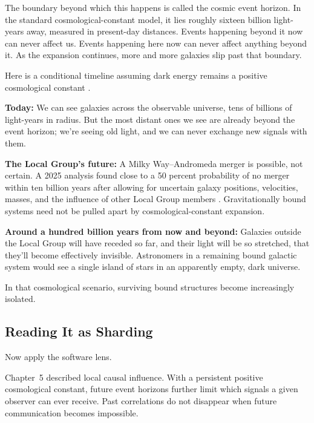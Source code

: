 The boundary beyond which this happens is called the cosmic event horizon. In the standard cosmological-constant model, it lies roughly sixteen billion light-years away, measured in present-day distances. Events happening beyond it now can never affect us. Events happening here now can never affect anything beyond it. As the expansion continues, more and more galaxies slip past that boundary.

\begin{examplebox}
Here is a conditional timeline assuming dark energy remains a positive cosmological constant \cite{loeb2002,krauss2007}.

\begin{compactchecklist}
\item \textbf{Today:} We can see galaxies across the observable universe, tens of billions of light-years in radius. But the most distant ones we see are already beyond the event horizon; we're seeing old light, and we can never exchange new signals with them.
\item \textbf{The Local Group's future:} A Milky Way--Andromeda merger is possible, not certain. A 2025 analysis found close to a 50 percent probability of no merger within ten billion years after allowing for uncertain galaxy positions, velocities, masses, and the influence of other Local Group members \cite{sawala2025collision}. Gravitationally bound systems need not be pulled apart by cosmological-constant expansion.
\item \textbf{Around a hundred billion years from now and beyond:} Galaxies outside the Local Group will have receded so far, and their light will be so stretched, that they'll become effectively invisible. Astronomers in a remaining bound galactic system would see a single island of stars in an apparently empty, dark universe.
\end{compactchecklist}

In that cosmological scenario, surviving bound structures become increasingly isolated.
\end{examplebox}

\subsection{Reading It as Sharding}

Now apply the software lens.

Chapter~5 described local causal influence. With a persistent positive cosmological constant, future event horizons further limit which signals a given observer can ever receive. Past correlations do not disappear when future communication becomes impossible.

